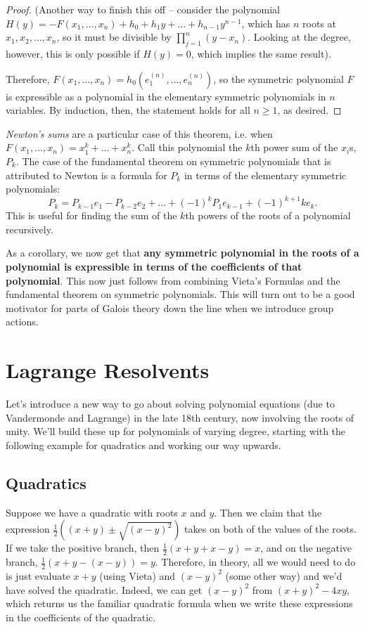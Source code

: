 \documentclass[12pt]{scrartcl}
\begin{document}
\begin{proof}
	(Another way to finish this off -- consider the polynomial $H(y) = -F(x_1, \dots, x_n) + h_0 + h_1 y + \dots + h_{n-1} y^{n-1}$, which has $n$ roots at $x_1, x_2, \dots, x_n$, so it must be divisible by $\prod_{j=1}^n (y - x_n)$. Looking at the degree, however, this is only possible if $H(y) = 0$, which implies the same result).

	Therefore, $F(x_1, \dots, x_n) = h_0(e_1^{(n)}, \dots, e_n^{(n)})$, so the symmetric polynomial $F$ is expressible as a polynomial in the elementary symmetric polynomials in $n$ variables. By induction, then, the statement holds for all $n \geq 1$, as desired.
\end{proof}

\begin{remark}
	\textit{Newton's sums} are a particular case of this theorem, i.e. when $F(x_1, \dots, x_n) = x_1^k + \dots + x_n^k$. Call this polynomial the $k$th power sum of the $x_i$s, $P_k$. The case of the fundamental theorem on symmetric polynomials that is attributed to Newton is a formula for $P_k$ in terms of the elementary symmetric polynomials:
	\[
		P_k = P_{k-1} e_1 - P_{k-2} e_2 + \dots + (-1)^{k} P_1 e_{k-1} + (-1)^{k+1} k e_k
		.\]
	This is useful for finding the sum of the $k$th powers of the roots of a polynomial recursively.
\end{remark}

As a corollary, we now get that \textbf{any symmetric polynomial in the roots of a polynomial is expressible in terms of the coefficients of that polynomial}. This now just follows from combining Vieta's Formulas and the fundamental theorem on symmetric polynomials. This will turn out to be a good motivator for parts of Galois theory down the line when we introduce group actions.


\section{Lagrange Resolvents}
Let's introduce a new way to go about solving polynomial equations (due to Vandermonde and Lagrange) in the late 18th century, now involving the roots of unity. We'll build these up for polynomials of varying degree, starting with the following example for quadratics and working our way upwards. 

\subsection{Quadratics}
Suppose we have a quadratic with roots $x$ and $y$. Then we claim that the expression $\frac 12 ( (x + y) \pm  \sqrt{ (x-y)^2 })$ takes on both of the values of the roots. If we take the positive branch, then $\frac 12( x + y + x - y ) = x$, and on the negative branch, $\frac 12( x + y - (x - y)) = y$. Therefore, in theory, all we would need to do is just evaluate $x + y$ (using Vieta) and $(x - y)^2$ (some other way) and we'd have solved the quadratic. Indeed, we can get $(x-y)^2$ from $(x+y)^2 - 4xy$, which returns us the familiar quadratic formula when we write these expressions in the coefficients of the quadratic. 
\end{document}
